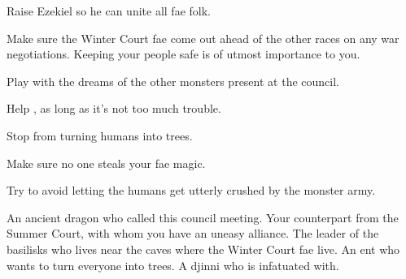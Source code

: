 \documentclass[char]{guildcamp2}
\begin{document}
\begin{itemz}[Goals]
  \item Raise Ezekiel so he can unite all fae folk.
  \item Make sure the Winter Court fae come out ahead of the other races on any war negotiations. Keeping your people safe is of utmost importance to you.
  \item Play with the dreams of the other monsters present at the council.
  \item Help \cBasilisk{}, as long as it's not too much trouble.
  \item Stop \cEnt{\intro} from turning humans into trees.
  \item Make sure no one steals your fae magic.
  \item Try to avoid letting the humans get utterly crushed by the monster army.
\end{itemz}


\begin{contacts}
  \contact{\cOnyx{}} An ancient dragon who called this council meeting.
  \contact{\cTreeFae{}} Your counterpart from the Summer Court, with whom you have an uneasy alliance.
  \contact{\cBasilisk{}} The leader of the basilisks who lives near the caves where the Winter Court fae live.
    \contact{\cEnt{\intro}} An ent who wants to turn everyone into trees.
        \contact{\cWizard{}} A djinni who \cTreeFae{} is infatuated with.
\end{contacts}
\end{document}
